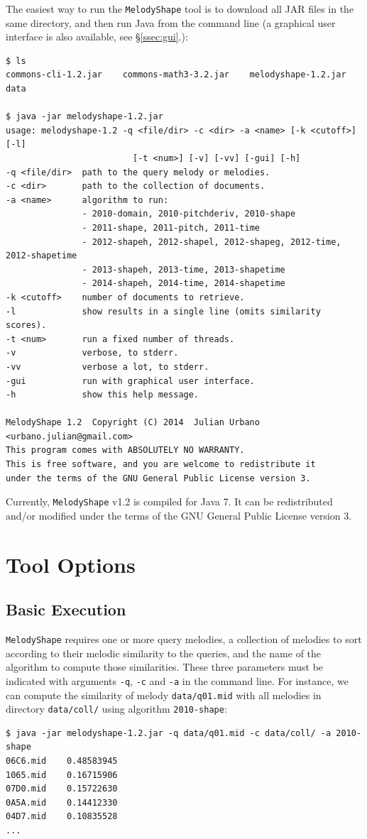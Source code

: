 \documentclass[twoside]{article}
\begin{document}
The easiest way to run the \texttt{MelodyShape} tool is to download all JAR files in the same directory, and then run Java from the command line (a graphical user interface is also available, see \S\ref{ssec:gui}.):
\begin{lstlisting}
$ ls
commons-cli-1.2.jar    commons-math3-3.2.jar    melodyshape-1.2.jar    data

$ java -jar melodyshape-1.2.jar
usage: melodyshape-1.2 -q <file/dir> -c <dir> -a <name> [-k <cutoff>] [-l]
                         [-t <num>] [-v] [-vv] [-gui] [-h]
-q <file/dir>  path to the query melody or melodies.
-c <dir>       path to the collection of documents.
-a <name>      algorithm to run:
               - 2010-domain, 2010-pitchderiv, 2010-shape
               - 2011-shape, 2011-pitch, 2011-time
               - 2012-shapeh, 2012-shapel, 2012-shapeg, 2012-time, 2012-shapetime
               - 2013-shapeh, 2013-time, 2013-shapetime
               - 2014-shapeh, 2014-time, 2014-shapetime
-k <cutoff>    number of documents to retrieve.
-l             show results in a single line (omits similarity scores).
-t <num>       run a fixed number of threads.
-v             verbose, to stderr.
-vv            verbose a lot, to stderr.
-gui           run with graphical user interface.
-h             show this help message.

MelodyShape 1.2  Copyright (C) 2014  Julian Urbano <urbano.julian@gmail.com>
This program comes with ABSOLUTELY NO WARRANTY.
This is free software, and you are welcome to redistribute it
under the terms of the GNU General Public License version 3.
\end{lstlisting}

Currently, \texttt{MelodyShape} v1.2 is compiled for Java 7. It can be redistributed and/or modified under the terms of the GNU General Public License version 3.

\section{Tool Options}

\subsection{Basic Execution}

\texttt{MelodyShape} requires one or more query melodies, a collection of melodies to sort according to their melodic similarity to the queries, and the name of the algorithm to compute those similarities. These three parameters must be indicated with arguments \texttt{-q}, \texttt{-c} and \texttt{-a} in the command line. For instance, we can compute the similarity of melody \texttt{data/q01.mid} with all melodies in directory \texttt{data/coll/} using algorithm \texttt{2010-shape}:
\begin{lstlisting}
$ java -jar melodyshape-1.2.jar -q data/q01.mid -c data/coll/ -a 2010-shape
06C6.mid    0.48583945
1065.mid    0.16715906
07D0.mid    0.15722630
0A5A.mid    0.14412330
04D7.mid    0.10835528
...
\end{lstlisting}
\end{document}
